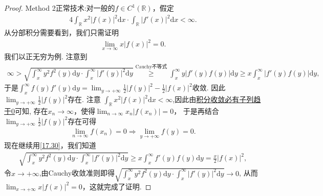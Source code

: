 \documentclass[../../main.tex]{subfiles}
\begin{document}
\begin{proof}
{\heiti Method 2正常技术:}对一般的$f\in C^1(\mathbb{R})$，假定
\begin{align*}
4\int_{\mathbb{R}}x^2|f(x)|^2\mathrm{d}x\cdot\int_{\mathbb{R}}|f'(x)|^2\mathrm{d}x < \infty.
\end{align*}
从分部积分需要看到，我们只需证明
\begin{align*}
\lim_{x\to\infty}x|f(x)|^2 = 0.
\end{align*}
我们以正无穷为例. 注意到
\begin{align}
\infty >\sqrt{\int_{x}^{\infty}y^2f^2(y)\mathrm{d}y\cdot\int_{x}^{\infty}|f'(y)|^2\mathrm{d}y} \stackrel{\text{Cauchy不等式}}{\geqslant} \int_{x}^{\infty}y|f'(y)f(y)|\mathrm{d}y \geqslant x\int_{x}^{\infty}|f'(y)f(y)|\mathrm{d}y, \label{17.30}
\end{align}
于是$\int_{x}^{\infty}f(y)f'(y)\mathrm{d}y=\lim_{y\to +\infty}\frac{1}{2}|f(y)|^2-\frac{1}{2}|f(x)|^2$收敛. 因此$\lim_{y\to +\infty}\frac{1}{2}|f(y)|^2$存在. 注意
$\int_{\mathbb{R}}x^2|f(x)|^2\mathrm{d}x < \infty$,因此由\hyperref[proposition:积分收敛必有子列趋于0]{积分收敛必有子列趋于0}可知, 存在$x_n\to \infty$，使得$\lim_{n\to\infty}x_n|f(x_n)| = 0$，
于是再结合$\lim_{y\to +\infty}\frac{1}{2}|f(y)|^2$存在可得
\begin{align*}
\lim_{n\to\infty}f(x_n) = 0 \Rightarrow \lim_{y\to +\infty}f(y) = 0.
\end{align*}
现在继续用\eqref{17.30}，我们知道
\begin{align*}
\sqrt{\int_{x}^{\infty}y^2f^2(y)\mathrm{d}y\cdot\int_{x}^{\infty}|f'(y)|^2\mathrm{d}y} \geqslant x\int_{x}^{\infty}f'(y)f(y)\mathrm{d}y = \frac{x}{2}|f(x)|^2,
\end{align*}
令$x\to +\infty$,由Cauchy收敛准则即得$\sqrt{\int_{x}^{\infty}y^2f^2(y)\mathrm{d}y\cdot\int_{x}^{\infty}|f'(y)|^2\mathrm{d}y}\to 0$,
从而$\lim_{x\to +\infty}x|f(x)|^2 = 0$，这就完成了证明. 
\end{proof}
\end{document}
